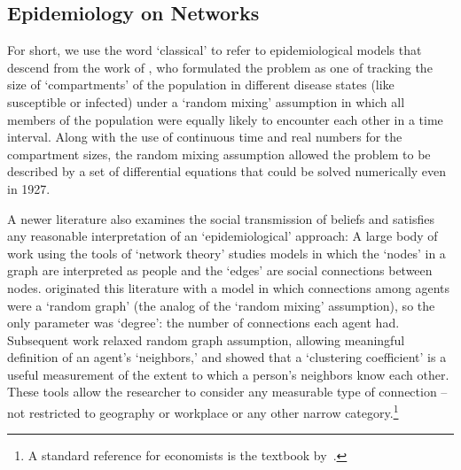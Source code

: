\subsection{Epidemiology on Networks}\label{subsec:epiNet}

For short, we use the word `classical' to refer to epidemiological models that descend from the work of \cite{kermack_contribution_1927}, who formulated the problem as one of tracking the size of `compartments' of the population in different disease states (like susceptible or infected) under a `random mixing' assumption in which all members of the population were equally likely to encounter each other in a time interval.  Along with the use of continuous time and real numbers for the compartment sizes, the random mixing assumption allowed the problem to be described by a set of differential equations that could be solved numerically even in 1927.

A newer literature also examines the social transmission of beliefs and satisfies any reasonable interpretation of  an `epidemiological' approach:  A large body of work using the tools of `network theory' studies models in which the `nodes' in a graph are interpreted as people and the `edges' are social connections between nodes.  \cite{erdos1960evolution} originated this literature with a model in which connections among agents were a `random graph' (the analog of the `random mixing' assumption), so the only parameter was `degree': the number of connections each agent had.  Subsequent work relaxed random graph assumption, allowing meaningful definition of an agent's `neighbors,' and showed that a `clustering coefficient' is a useful measurement of the extent to which a person's neighbors know each other.  These tools allow the researcher to consider any measurable type of connection -- not restricted to geography or workplace or any other narrow category.\footnote{A standard reference for economists is the textbook by~\cite{jackson_social_2010}.}


